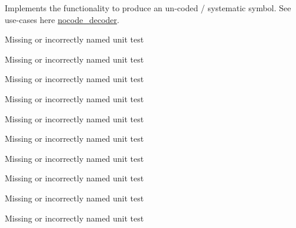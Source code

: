 \begin{DoxyRefList}
Implements the functionality to produce an un-\/coded / systematic symbol. See use-\/cases here \hyperlink{}{nocode\-\_\-decoder}.  
\item[\label{todo__todo000029}%
\hypertarget{todo__todo000029}{}%
Class \hyperlink{classkodo_1_1object__decoder}{kodo\-:\-:object\-\_\-decoder$<$ Decoder\-Type, Block\-Partitioning $>$} ]Missing or incorrectly named unit test  
\item[\label{todo__todo000030}%
\hypertarget{todo__todo000030}{}%
Class \hyperlink{classkodo_1_1object__encoder}{kodo\-:\-:object\-\_\-encoder$<$ Object\-Data, Encoder\-Type, Block\-Partitioning $>$} ]Missing or incorrectly named unit test  
\item[\label{todo__todo000031}%
\hypertarget{todo__todo000031}{}%
Class \hyperlink{classkodo_1_1partial__shallow__symbol__storage}{kodo\-:\-:partial\-\_\-shallow\-\_\-symbol\-\_\-storage$<$ Super\-Coder $>$} ]Missing or incorrectly named unit test


\item[\label{todo__todo000032}%
\hypertarget{todo__todo000032}{}%
Class \hyperlink{classkodo_1_1payload__decoder}{kodo\-:\-:payload\-\_\-decoder$<$ Super\-Coder $>$} ]Missing or incorrectly named unit test


\item[\label{todo__todo000033}%
\hypertarget{todo__todo000033}{}%
Class \hyperlink{classkodo_1_1payload__encoder}{kodo\-:\-:payload\-\_\-encoder$<$ Super\-Coder $>$} ]Missing or incorrectly named unit test


\item[\label{todo__todo000034}%
\hypertarget{todo__todo000034}{}%
Class \hyperlink{classkodo_1_1payload__recoder}{kodo\-:\-:payload\-\_\-recoder$<$ Recoding\-Stack, Super\-Coder $>$} ]Missing or incorrectly named unit test


\item[\label{todo__todo000035}%
\hypertarget{todo__todo000035}{}%
Class \hyperlink{classkodo_1_1plain__symbol__id}{kodo\-:\-:plain\-\_\-symbol\-\_\-id$<$ Super\-Coder $>$} ]Missing or incorrectly named unit test


\item[\label{todo__todo000039}%
\hypertarget{todo__todo000039}{}%
Class \hyperlink{classkodo_1_1random__annex__decoder}{kodo\-:\-:random\-\_\-annex\-\_\-decoder$<$ Decoder\-Type, Block\-Partitioning $>$} ]Missing or incorrectly named unit test  
\item[\label{todo__todo000041}%
\hypertarget{todo__todo000041}{}%
Class \hyperlink{classkodo_1_1random__annex__encoder}{kodo\-:\-:random\-\_\-annex\-\_\-encoder$<$ Encoder\-Type, Block\-Partitioning $>$} ]Missing or incorrectly named unit test  
\item[\label{todo__todo000042}%
\hypertarget{todo__todo000042}{}%
Class \hyperlink{classkodo_1_1rank__info}{kodo\-:\-:rank\-\_\-info$<$ Super\-Coder $>$} ]Missing or incorrectly named unit test



\end{DoxyRefList}
